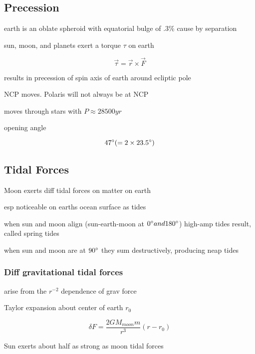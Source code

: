 \documentclass{article}
\begin{document}
\subsection{Precession}
\begin{list}{-}{}
\item earth is an oblate spheroid with equatorial bulge of .3\% cause by separation
\item sun, moon, and planets exert a torque $\tau$ on earth
\item \[\vec{\tau} = \vec{r} \times \vec{F}\]
\item results in precession of spin axis of earth around ecliptic pole 
\item NCP moves. Polaris will not always be at NCP
\item moves through stars with $P \approx 28500 yr$
\item opening angle 
\item \[47\degree (=2\times23.5\degree)\]
\end{list}

\subsection{Tidal Forces}
\begin{list}{-}{}
\item Moon exerts diff tidal forces on matter on earth
\item esp noticeable on earths ocean surface as tides
\item when sun and moon align (sun-earth-moon at $0\degree and 180 \degree $) high-amp tides result, called spring tides
\item when sun and moon are at $90\degree$ they sum destructively, producing neap tides 
\end{list}
\subsubsection{Diff gravitational tidal forces}
\begin{list}{-}{}
\item arise from the $r^{-2}$ dependence of grav force
\item Taylor expansion about center of earth $r_0$ 
\item \[\delta F = \frac{2GM_{moon}m}{r^3}(r-r_0)\]
\item Sun exerts about half as strong as moon tidal forces
\end{list}
\end{document}
